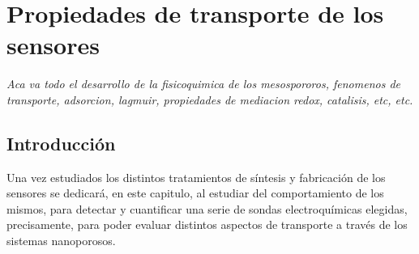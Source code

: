  \newcommand{\NoBiblioEQ}[1]{
 \ifthenelse{\equal{#1}{verdadero}}{}{}
 \NoBiblioEQ{verdadero}}


 \FormatoCapituloDosLineas
 
 \chapter{Propiedades de transporte de los sensores}
 \label{chap:Electroquimica}

 \thispagestyle{empty}
	
 \noindent\textit{Aca va todo el desarrollo de la fisicoquimica de los mesospororos, fenomenos de  transporte, adsorcion, lagmuir, propiedades de mediacion redox, catalisis, etc, etc.}

 \vfill
 \minitoc
 \newpage

\section{Introducción}

	Una vez estudiados los distintos tratamientos de síntesis y fabricación de los sensores se dedicará, en este capitulo, al estudiar del comportamiento de los mismos, para detectar y cuantificar una serie de sondas electroquímicas elegidas, precisamente, para poder evaluar distintos aspectos de transporte a través de los sistemas nanoporosos. 

